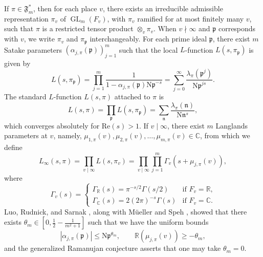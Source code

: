 \documentclass[12pt,reqno]{amsart}
\theoremstyle{remark}
\newcommand{\re}{\mathbb{R}}
\DeclareMathOperator{\GL}{GL}
\renewcommand{\Re}{\mathrm{Re}}
\newcommand{\N}{\mathrm{N}}
\newcommand{\R}{\mathbb{R}}
\newcommand{\kp}{\mathfrak{p}}
\newcommand{\cO}{\mathcal{O}}
\numberwithin{equation}{section}
\begin{document}
If $\pi\in\mathfrak{F}_m^*$, then for each place $v$, there exists an irreducible admissible representation $\pi_v$ of $\GL_m(F_v)$, with $\pi_v$ ramified for at most finitely many $v$, such that $\pi$ is a restricted tensor product $\otimes_v \pi_v$. When $v\nmid\infty$ and $\kp$ corresponds with $v$, we write $\pi_v$ and $\pi_{\kp}$ interchangeably. For each prime ideal $\kp$, there exist $m$ Satake parameters $(\alpha_{j,\pi}(\kp))_{j=1}^{m}$ such that the local $L$-function $L(s,\pi_{\kp})$ is given by
\[
L(s, \pi_{\kp}) = \prod_{j=1}^m \frac{1}{1-\alpha_{j,\pi}(\kp)\N \kp^{-s}} = \sum_{j=0}^{\infty} \frac{\lambda_{\pi}(\kp^j)}{\N\kp^{js}}.
\]
The standard $L$-function $L(s,\pi)$ attached to $\pi$ is 
\[
L(s,\pi)=\prod_{\kp} L(s, \pi_{\kp}) %
= \sum_{\mathfrak{n}}\frac{\lambda_{\pi}(\mathfrak{n})}{\N\mathfrak{n}^{s}},
\]
which converges absolutely for $\Re(s) > 1$.
If $v\mid \infty$, there exist  $m$ Langlands parameters at $v$, namely, $\mu_{1,\pi}(v), \mu_{2,\pi}(v), \ldots, \mu_{m,\pi}(v) \in \mathbb{C}$, from which we define
\[
L_{\infty}(s,\pi)=\prod_{v\mid\infty}L(s,\pi_v) = \prod_{v\mid\infty}\prod_{j=1}^m \Gamma_v(s+\mu_{j,\pi}(v)), %
\]
where 
\begin{equation}\label{eq:gamma_v}
\Gamma_v(s)=\begin{cases}
\Gamma_{\R}(s) = \pi^{-s/2}\Gamma(s/2)&\mbox{if $F_v=\R$,}\\
\Gamma_{\mathbb{C}}(s) = 2(2\pi)^{-s}\Gamma(s)&\mbox{if $F_v=\mathbb{C}$.}
\end{cases}
\end{equation}
Luo, Rudnick, and Sarnak \cite{LRS}, along with M\"ueller  and Speh \cite{MS}, showed that there exists $\theta_m\in[0,\frac{1}{2}-\frac{1}{m^2+1}]$ such that we have the uniform bounds %
\begin{equation}
\label{eqn:GRC1}
|\alpha_{j,\pi}(\kp)|\leq \N\kp^{\theta_m},\qquad \re(\mu_{j,\pi}(v))\geq -\theta_m,
\end{equation}
and the generalized Ramanujan conjecture asserts that one may take $\theta_m=0$. 
\end{document}
